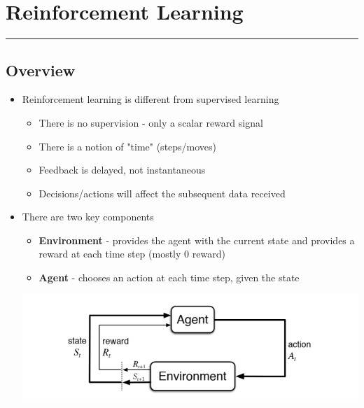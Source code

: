 \documentclass[11pt]{article}
\begin{document}
\pagebreak

\section{Reinforcement Learning}
\hrule \vspace{15pt}

\subsection{Overview}
\begin{itemize}
\item Reinforcement learning is different from supervised learning
\begin{itemize}
\item There is no supervision - only a scalar reward signal 
\item There is a notion of "time" (steps/moves)
\item Feedback is delayed, not instantaneous 
\item Decisions/actions will affect the subsequent data received
\end{itemize}
\item There are two key components 
\begin{itemize}
\item \textbf{Environment} - provides the agent with the current state and provides a reward at each time step (mostly 0 reward)
\item \textbf{Agent} - chooses an action at each time step, given the state
\end{itemize} 
\begin{center}
\includegraphics[scale=0.9]{images/rl.png}
\end{center}\
\end{itemize}
\end{document}
